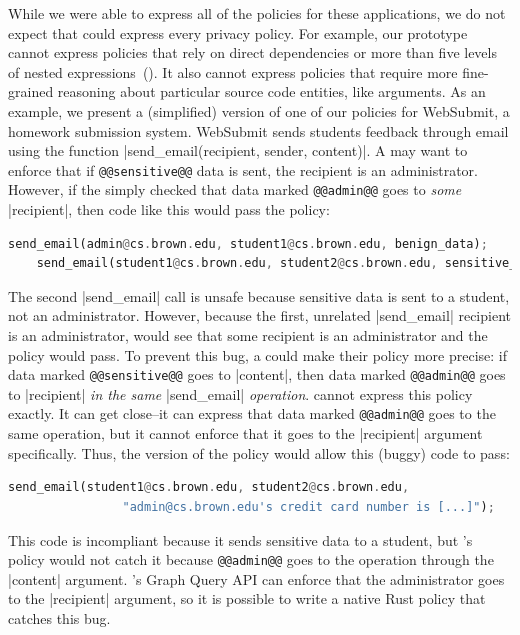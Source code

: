 While we were able to express all of the policies for these applications,
we do not expect that \syslang{} could express every privacy policy.
%
For example, our \syslang{} prototype cannot express policies that rely on direct dependencies 
or more than five levels of nested expressions~().
%
It also cannot express policies that require more fine-grained reasoning about particular source code
entities, like arguments.
%
As an example, we present a (simplified) version of one of our policies for WebSubmit, a homework submission system.
%
WebSubmit sends students feedback through email using the function |send_email(recipient, sender, content)|.
%
A \ce{} may want to enforce that if \lstinline[language=CNL]|@@sensitive@@| data is sent,
the recipient is an administrator.
%
However, if the \ce{} simply checked that data marked \lstinline[language=CNL]|@@admin@@| goes to \emph{some} |recipient|,
then code like this would pass the policy:
\begin{lstlisting}[language=Rust]
    send_email(admin@cs.brown.edu, student1@cs.brown.edu, benign_data);
    send_email(student1@cs.brown.edu, student2@cs.brown.edu, sensitive_data);
\end{lstlisting}
The second |send_email| call is unsafe because sensitive data is sent to a student, not an administrator.
%
However, because the first, unrelated |send_email| recipient is an administrator, 
\sys{} would see that some recipient is an administrator and the policy would pass.
%
To prevent this bug, a \ce{} could make their policy more precise: if data marked \lstinline[language=CNL]|@@sensitive@@| goes to |content|,
then data marked \lstinline[language=CNL]|@@admin@@| goes to |recipient| \emph{in the same} |send_email| \emph{operation}.
%
\syslang{} cannot express this policy exactly.
%
It can get close--it can express that data marked \lstinline[language=CNL]|@@admin@@| goes to the same operation,
but it cannot enforce that it goes to the |recipient| argument specifically.
%
Thus, the \syslang{} version of the policy would allow this (buggy) code to pass:
\begin{lstlisting}[language=Rust]
    send_email(student1@cs.brown.edu, student2@cs.brown.edu, 
                "admin@cs.brown.edu's credit card number is [...]");
\end{lstlisting}
%
This code is incompliant because it sends sensitive data to a student,
but \syslang{}'s policy would not catch it because \lstinline[language=CNL]|@@admin@@| goes to 
the operation through the |content| argument.
%
\sys{}'s Graph Query API can enforce that the administrator goes to the |recipient| argument,
so it is possible to write a native Rust policy that catches this bug.

